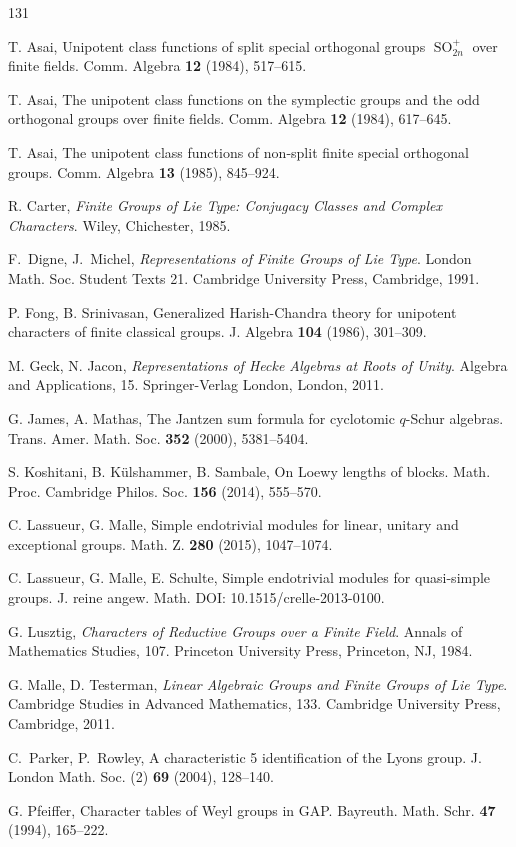 \documentclass{ert-l}
\newcommand{\SO}{{\operatorname{SO}}}
\theoremstyle{definition}
\theoremstyle{remark}
\begin{document}
\begin{thebibliography}{131}

{\sc T. Asai}, Unipotent class functions of split special orthogonal groups
  $\SO_{2n}^+$ over finite fields. Comm. Algebra {\bf12} (1984), 517--615.

{\sc T. Asai}, The unipotent class functions on the symplectic groups and the
  odd orthogonal groups over finite fields.  Comm. Algebra {\bf12} (1984),
  617--645.

{\sc T. Asai}, The unipotent class functions of non-split finite special
  orthogonal groups. Comm. Algebra {\bf13} (1985), 845--924.

{\sc R. Carter}, \emph{Finite Groups of Lie Type: Conjugacy Classes and
  Complex Characters}. Wiley, Chichester, 1985.

{\sc F.~Digne, J.~Michel}, \emph{Representations of Finite Groups of Lie Type}.
  London Math. Soc. Student Texts 21. Cambridge University Press, Cambridge,
  1991.

{\sc P. Fong, B. Srinivasan}, Generalized Harish-Chandra theory for unipotent
  characters of finite classical groups. J. Algebra {\bf104} (1986), 301--309.

{\sc M. Geck, N. Jacon}, \emph{Representations of Hecke Algebras at Roots of
  Unity}. Algebra and Applications, 15. Springer-Verlag London, London, 2011.

{\sc G. James, A. Mathas}, The Jantzen sum formula for cyclotomic $q$-Schur
  algebras. Trans. Amer. Math. Soc. {\bf352} (2000), 5381--5404.

{\sc S. Koshitani, B. K\"ulshammer, B. Sambale}, On Loewy lengths of blocks.
  Math. Proc. Cambridge Philos. Soc. {\bf156} (2014), 555--570.

{\sc C. Lassueur, G. Malle}, Simple endotrivial modules for linear, unitary
  and exceptional groups. Math. Z. {\bf280} (2015), 1047--1074.

{\sc C. Lassueur, G. Malle, E. Schulte}, Simple endotrivial modules for
  quasi-simple groups. J. reine angew. Math. DOI: 10.1515/crelle-2013-0100.

{\sc G. Lusztig}, \emph{Characters of Reductive Groups over a Finite Field}.
  Annals of Mathematics Studies, 107. Princeton University Press, Princeton,
  NJ, 1984.

{\sc G. Malle, D. Testerman}, \emph{Linear Algebraic Groups and Finite Groups
  of Lie Type}. Cambridge Studies in Advanced Mathematics, 133.
  Cambridge University Press, Cambridge, 2011.

{\sc C.~Parker, P.~Rowley}, A characteristic 5 identification of the Lyons
  group. J. London Math. Soc. (2) {\bf69} (2004), 128--140.

{\sc G. Pfeiffer}, Character tables of Weyl groups in GAP. Bayreuth. Math.
  Schr. {\bf47} (1994), 165--222.

\end{thebibliography}
\end{document}
